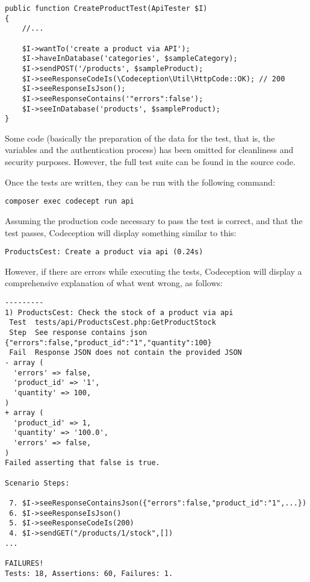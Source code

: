 \begin{verbatim}
public function CreateProductTest(ApiTester $I)
{
	//...

	$I->wantTo('create a product via API');
	$I->haveInDatabase('categories', $sampleCategory);
	$I->sendPOST('/products', $sampleProduct);
	$I->seeResponseCodeIs(\Codeception\Util\HttpCode::OK); // 200
	$I->seeResponseIsJson();
	$I->seeResponseContains('"errors":false');
	$I->seeInDatabase('products', $sampleProduct);
}
\end{verbatim}

Some code (basically the preparation of the data for the test, that is, the  variables and the authentication process) has been omitted for cleanliness and security purposes. However, the full test suite can be found in the source code.

Once the tests are written, they can be run with the following command:

\begin{verbatim}
composer exec codecept run api
\end{verbatim}

Assuming the production code necessary to pass the test is correct, and that the test passes, Codeception will display something similar to this:

\begin{verbatim}
ProductsCest: Create a product via api (0.24s)
\end{verbatim}

However, if there are errors while executing the tests, Codeception will display a comprehensive explanation of what went wrong, as follows:

\begin{verbatim}
---------
1) ProductsCest: Check the stock of a product via api
 Test  tests/api/ProductsCest.php:GetProductStock
 Step  See response contains json {"errors":false,"product_id":"1","quantity":100}
 Fail  Response JSON does not contain the provided JSON
- array (
  'errors' => false,
  'product_id' => '1',
  'quantity' => 100,
)
+ array (
  'product_id' => 1,
  'quantity' => '100.0',
  'errors' => false,
)
Failed asserting that false is true.

Scenario Steps:

 7. $I->seeResponseContainsJson({"errors":false,"product_id":"1",...})
 6. $I->seeResponseIsJson()
 5. $I->seeResponseCodeIs(200)
 4. $I->sendGET("/products/1/stock",[])
...

FAILURES!
Tests: 18, Assertions: 60, Failures: 1.
\end{verbatim}

